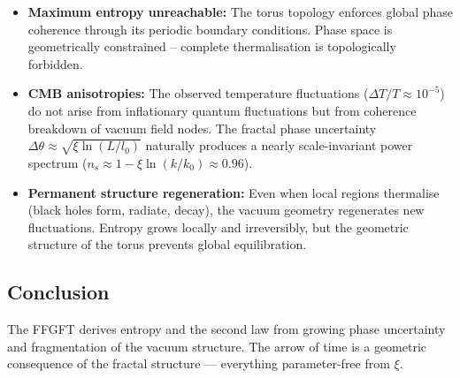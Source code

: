 	\begin{itemize}[leftmargin=*]
		\item \textbf{Maximum entropy unreachable:} The torus topology enforces global phase coherence through its periodic boundary conditions. Phase space is geometrically constrained -- complete thermalisation is topologically forbidden.
		\item \textbf{CMB anisotropies:} The observed temperature fluctuations ($\Delta T/T \approx 10^{-5}$) do not arise from inflationary quantum fluctuations but from coherence breakdown of vacuum field nodes. The fractal phase uncertainty $\Delta \theta \approx \sqrt{\xi \ln(L/l_0)}$ naturally produces a nearly scale-invariant power spectrum ($n_s \approx 1 - \xi \ln(k/k_0) \approx 0.96$).
		\item \textbf{Permanent structure regeneration:} Even when local regions thermalise (black holes form, radiate, decay), the vacuum geometry regenerates new fluctuations. Entropy grows locally and irreversibly, but the geometric structure of the torus prevents global equilibration.
	\end{itemize}
	
	\subsection*{Conclusion}
	
	The FFGFT derives entropy and the second law from growing phase uncertainty and fragmentation of the vacuum structure. The arrow of time is a geometric consequence of the fractal structure — everything parameter-free from \(\xi\).



